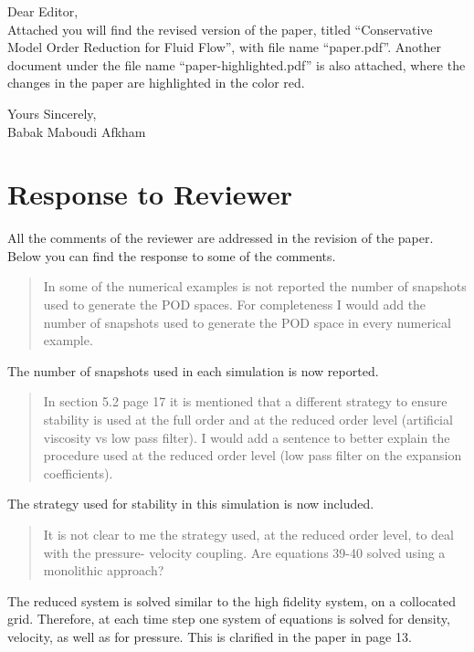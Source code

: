 \documentclass[a4paper]{article}
\newcommand{\breview}{\begin{quotation}\begin{bf}\noindent}
\newcommand{\ereview}{\end{bf}\end{quotation}}
\begin{document}
Dear Editor, \\[1cm]

Attached you will find the revised version of the paper, titled ``Conservative Model Order Reduction for Fluid Flow'', with file name ``paper.pdf''. Another document under the file name ``paper-highlighted.pdf'' is also attached, where the changes in the paper are highlighted in the color red.

Yours Sincerely,\\[1.0cm]
Babak Maboudi Afkham
\\[1cm]

\section*{Response to Reviewer}

All the comments of the reviewer are addressed in the revision of the paper. Below you can find the response to some of the comments.

\breview
In some of the numerical examples is not reported the number of snapshots used to generate the POD spaces. For completeness I would add the number of snapshots used to generate the POD space in every numerical example.\ereview

The number of snapshots used in each simulation is now reported.

\breview
In section 5.2 page 17 it is mentioned that a different strategy to ensure stability is used at the full order and at the reduced order level (artificial viscosity vs low pass filter). I would add a sentence to better explain the procedure used at the reduced order level (low pass filter on the expansion coefficients).
\ereview

The strategy used for stability in this simulation is now included.

\breview
It is not clear to me the strategy used, at the reduced order level, to deal with the pressure-
velocity coupling. Are equations 39-40 solved using a monolithic approach?
\ereview

The reduced system is solved similar to the high fidelity system, on a collocated grid. Therefore, at each time step one system of equations is solved for density, velocity, as well as for pressure. This is clarified in the paper in page 13.  
\end{document}

